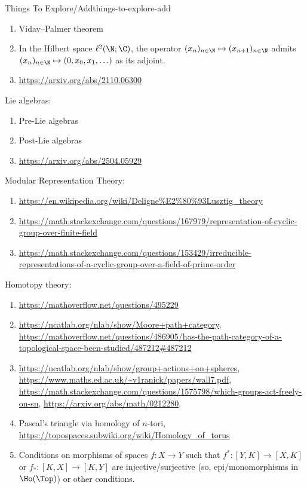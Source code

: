 \begin{remark}{Things To Explore/Add}{things-to-explore-add}
\begin{enumerate}
        \item Vidav--Palmer theorem
        \item In the Hilbert space $\ell^{2}(\N;\C)$, the operator $(x_{n})_{n\in\N}\mapsto(x_{n+1})_{n\in\N}$ admits $(x_{n})_{n\in\N}\mapsto(0,x_{0},x_{1},\ldots)$ as its adjoint.
        \item \url{https://arxiv.org/abs/2110.06300}
    \end{enumerate}
    Lie algebras:
    \begin{enumerate}
        \item Pre-Lie algebras
        \item Post-Lie algebras
        \item \url{https://arxiv.org/abs/2504.05929}
    \end{enumerate}
    Modular Representation Theory:
    \begin{enumerate}
        \item \url{https://en.wikipedia.org/wiki/Deligne\%E2\%80\%93Lusztig\_theory}
        \item \url{https://math.stackexchange.com/questions/167979/representation-of-cyclic-group-over-finite-field}
        \item \url{https://math.stackexchange.com/questions/153429/irreducible-representations-of-a-cyclic-group-over-a-field-of-prime-order}
    \end{enumerate}
    Homotopy theory:
    \begin{enumerate}
        \item \url{https://mathoverflow.net/questions/495229}
        \item \url{https://ncatlab.org/nlab/show/Moore+path+category}, \url{https://mathoverflow.net/questions/486905/has-the-path-category-of-a-topological-space-been-studied/487212#487212}
        \item \url{https://ncatlab.org/nlab/show/group+actions+on+spheres}, \url{https://www.maths.ed.ac.uk/~v1ranick/papers/wall7.pdf}, \url{https://math.stackexchange.com/questions/1575798/which-groups-act-freely-on-sn}, \url{https://arxiv.org/abs/math/0212280}.
        \item Pascal's triangle via homology of $n$-tori, \url{https://topospaces.subwiki.org/wiki/Homology_of_torus}
        \item Conditions on morphisms of spaces $f\colon X\to Y$ such that $f^{*}\colon[Y,K]\to[X,K]$ or $f_{*}\colon[K,X]\to[K,Y]$ are injective/surjective (so, epi/monomorphisms in $\Ho(\Top)$) or other conditions.
    \end{enumerate}

\end{remark}
